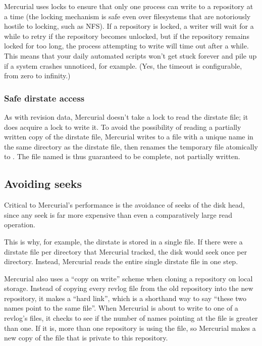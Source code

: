 Mercurial uses locks to ensure that only one process can write to a
repository at a time (the locking mechanism is safe even over
filesystems that are notoriously hostile to locking, such as NFS).  If
a repository is locked, a writer will wait for a while to retry if the
repository becomes unlocked, but if the repository remains locked for
too long, the process attempting to write will time out after a while.
This means that your daily automated scripts won't get stuck forever
and pile up if a system crashes unnoticed, for example.  (Yes, the
timeout is configurable, from zero to infinity.)

\subsubsection{Safe dirstate access}

As with revision data, Mercurial doesn't take a lock to read the
dirstate file; it does acquire a lock to write it.  To avoid the
possibility of reading a partially written copy of the dirstate file,
Mercurial writes to a file with a unique name in the same directory as
the dirstate file, then renames the temporary file atomically to
.  The file named  is thus
guaranteed to be complete, not partially written.

\subsection{Avoiding seeks}

Critical to Mercurial's performance is the avoidance of seeks of the
disk head, since any seek is far more expensive than even a
comparatively large read operation.

This is why, for example, the dirstate is stored in a single file.  If
there were a dirstate file per directory that Mercurial tracked, the
disk would seek once per directory.  Instead, Mercurial reads the
entire single dirstate file in one step.

Mercurial also uses a ``copy on write'' scheme when cloning a
repository on local storage.  Instead of copying every revlog file
from the old repository into the new repository, it makes a ``hard
link'', which is a shorthand way to say ``these two names point to the
same file''.  When Mercurial is about to write to one of a revlog's
files, it checks to see if the number of names pointing at the file is
greater than one.  If it is, more than one repository is using the
file, so Mercurial makes a new copy of the file that is private to
this repository.


